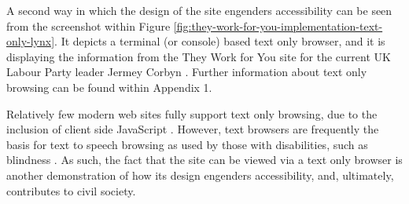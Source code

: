 A second way in which the design of the site engenders accessibility can be seen from the screenshot within Figure \ref{fig:they-work-for-you-implementation-text-only-lynx}.
It depicts a terminal (or console) based text only browser, and it is displaying the information from the They Work for You site for the current UK Labour Party leader Jermey Corbyn \cite{jeremy-corbyn-wiki}.
Further information about text only browsing can be found within Appendix 1.

Relatively few modern web sites fully support text only browsing, due to the inclusion of  client side JavaScript \cite{web-2.0-technologies}.
However, text browsers are frequently the basis for text to speech browsing as used by those with disabilities, such as blindness \cite{shelter-guide-web-accessibility}.
As such, the fact that the site can be viewed via a text only browser is another demonstration of how its design engenders accessibility, and, ultimately, contributes to civil society.
